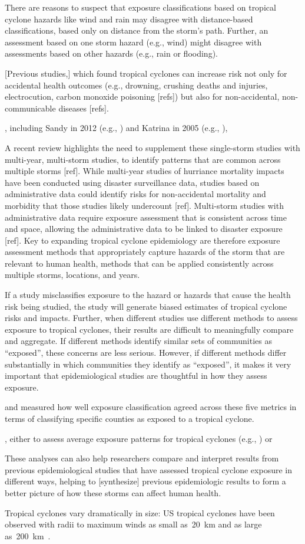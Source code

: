 There are reasons to suspect that
exposure classifications based on tropical cyclone hazards like wind and rain
may disagree with distance-based classifications, based only on distance from
the storm's path. Further, an assessment based on one storm hazard (e.g., wind)
might disagree with assessments based on other hazards (e.g., rain or
flooding).  

[Previous studies,] which found tropical cyclones can increase risk not only
for accidental health outcomes (e.g., drowning, crushing deaths and injuries,
electrocution, carbon monoxide poisoning [refs]) but also for non-accidental,
non-communicable diseases [refs].  

, including Sandy in 2012 (e.g., \parencite{swerdel2014}) and Katrina
in 2005 (e.g., \parencite{burton2009health}), 

A recent review highlights the need to supplement these single-storm studies
with multi-year, multi-storm studies, to identify patterns that are common
across multiple storms [ref]. While multi-year studies of hurriance mortality
impacts have been conducted using disaster surveillance data, studies based on
administrative data could identify risks for non-accidental mortality and
morbidity that those studies likely undercount [ref]. Multi-storm studies with
administrative data require exposure assessment that is consistent across time
and space, allowing the administrative data to be linked to disaster exposure
[ref]. Key to expanding tropical cyclone epidemiology are therefore exposure
assessment methods that appropriately capture hazards of the storm that are
relevant to human health, methods that can be applied consistently across
multiple storms, locations, and years. 

If a study misclassifies exposure to the hazard or hazards that cause the
health risk being studied, the study will generate biased estimates of tropical
cyclone risks and impacts. Further, when different studies use different
methods to assess exposure to tropical cyclones, their results are difficult to
meaningfully compare and aggregate. If different methods identify
similar sets of communities as ``exposed'',  these concerns are less serious.
However, if different methods differ substantially in which communities they
identify as ``exposed'', it makes it very important that epidemiological
studies are thoughtful in how they assess exposure.

 and
measured how well exposure classification agreed across these five metrics in
terms of classifying specific counties as exposed to a tropical cyclone.  

, either to assess average
exposure patterns for tropical cyclones (e.g., \cite{zandbergen2009}) or 

These analyses can also help
researchers compare and interpret results from previous epidemiological studies
that have assessed tropical cyclone exposure in different ways, helping to
[synthesize] previous epidemiologic results to form a better picture of how
these storms can affect human health. 

Tropical cyclones vary
dramatically in size: \ac{US} tropical cyclones have been observed with radii
to maximum winds as small as~20~\si{\kilo\metre} and as large
as~200~\si{\kilo\metre}~\parencite{mallin2006, quiring2011variations}.  
